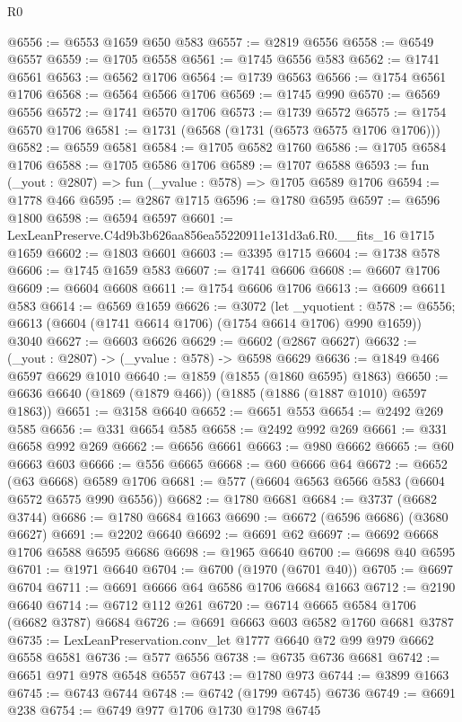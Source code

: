 \begin{lexlean}{R0}
\begin{coremodule}
@6556 := @6553 @1659 @650 @583
@6557 := @2819 @6556
@6558 := @6549 @6557
@6559 := @1705 @6558
@6561 := @1745 @6556 @583
@6562 := @1741 @6561
@6563 := @6562 @1706
@6564 := @1739 @6563
@6566 := @1754 @6561 @1706
@6568 := @6564 @6566 @1706
@6569 := @1745 @990
@6570 := @6569 @6556
@6572 := @1741 @6570 @1706
@6573 := @1739 @6572
@6575 := @1754 @6570 @1706
@6581 := @1731 (@6568 (@1731 (@6573 @6575 @1706 @1706)))
@6582 := @6559 @6581
@6584 := @1705 @6582 @1760
@6586 := @1705 @6584 @1706
@6588 := @1705 @6586 @1706
@6589 := @1707 @6588
@6593 := fun (_yout : @2807) => fun (_yvalue : @578) => @1705 @6589 @1706
@6594 := @1778 @466
@6595 := @2867 @1715
@6596 := @1780 @6595
@6597 := @6596 @1800
@6598 := @6594 @6597
@6601 := LexLeanPreserve.C4d9b3b626aa856ea55220911e131d3a6.R0.__fits_16 @1715 @1659
@6602 := @1803 @6601
@6603 := @3395 @1715
@6604 := @1738 @578
@6606 := @1745 @1659 @583
@6607 := @1741 @6606
@6608 := @6607 @1706
@6609 := @6604 @6608
@6611 := @1754 @6606 @1706
@6613 := @6609 @6611 @583
@6614 := @6569 @1659
@6626 := @3072
    (let _yquotient : @578 := @6556;
    @6613 (@6604 (@1741 @6614 @1706) (@1754 @6614 @1706) @990 @1659))
    @3040
@6627 := @6603 @6626
@6629 := @6602 (@2867 @6627)
@6632 := (_yout : @2807) -> (_yvalue : @578) -> @6598 @6629
@6636 := @1849 @466 @6597 @6629 @1010
@6640 := @1859 (@1855 (@1860 @6595) @1863)
@6650 := @6636 @6640 (@1869 (@1879 @466)) (@1885 (@1886 (@1887 @1010) @6597 @1863))
@6651 := @3158 @6640
@6652 := @6651 @553
@6654 := @2492 @269 @585
@6656 := @331 @6654 @585
@6658 := @2492 @992 @269
@6661 := @331 @6658 @992 @269
@6662 := @6656 @6661
@6663 := @980 @6662
@6665 := @60 @6663 @603
@6666 := @556 @6665
@6668 := @60 @6666 @64
@6672 := @6652 (@63 @6668) @6589 @1706
@6681 := @577 (@6604 @6563 @6566 @583 (@6604 @6572 @6575 @990 @6556))
@6682 := @1780 @6681
@6684 := @3737 (@6682 @3744)
@6686 := @1780 @6684 @1663
@6690 := @6672 (@6596 @6686) (@3680 @6627)
@6691 := @2202 @6640
@6692 := @6691 @62
@6697 := @6692 @6668 @1706 @6588 @6595 @6686
@6698 := @1965 @6640
@6700 := @6698 @40 @6595
@6701 := @1971 @6640
@6704 := @6700 (@1970 (@6701 @40))
@6705 := @6697 @6704
@6711 := @6691 @6666 @64 @6586 @1706 @6684 @1663
@6712 := @2190 @6640
@6714 := @6712 @112 @261
@6720 := @6714 @6665 @6584 @1706 (@6682 @3787) @6684
@6726 := @6691 @6663 @603 @6582 @1760 @6681 @3787
@6735 := LexLeanPreservation.conv_let @1777 @6640 @72 @99 @979 @6662 @6558 @6581
@6736 := @577 @6556
@6738 := @6735 @6736 @6681
@6742 := @6651 @971 @978 @6548 @6557
@6743 := @1780 @973
@6744 := @3899 @1663
@6745 := @6743 @6744
@6748 := @6742 (@1799 @6745) @6736
@6749 := @6691 @238
@6754 := @6749 @977 @1706 @1730 @1798 @6745

\end{coremodule}
\end{lexlean}
